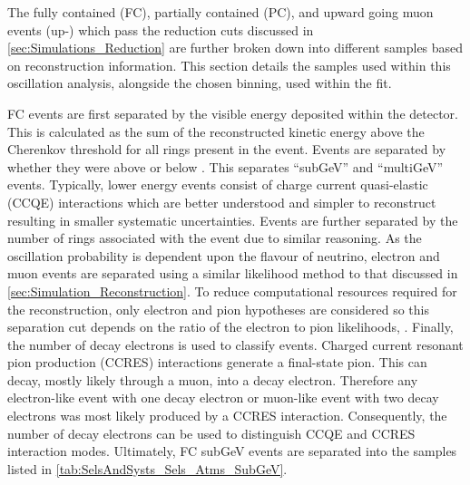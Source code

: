 The fully contained (FC), partially contained (PC), and upward going muon events (up-\quickmath{\mu}) which pass the reduction cuts discussed in \autoref{sec:Simulations_Reduction} are further broken down into different samples based on reconstruction information. This section details the samples used within this oscillation analysis, alongside the chosen binning, used within the fit.

FC events are first separated by the visible energy deposited within the detector. This is calculated as the sum of the reconstructed kinetic energy above the Cherenkov threshold for all rings present in the event. Events are separated by whether they were above or below . This separates ``subGeV'' and ``multiGeV'' events. Typically, lower energy events consist of charge current quasi-elastic (CCQE) interactions which are better understood and simpler to reconstruct resulting in smaller systematic uncertainties. Events are further separated by the number of rings associated with the event due to similar reasoning. As the oscillation probability is dependent upon the flavour of neutrino, electron and muon events are separated using a similar likelihood method to that discussed in \autoref{sec:Simulation_Reconstruction}. To reduce computational resources required for the reconstruction, only electron and pion hypotheses are considered so this separation cut depends on the ratio of the electron to pion likelihoods, . Finally, the number of decay electrons is used to classify events. Charged current resonant pion production (CCRES) interactions generate a final-state pion. This can decay, mostly likely through a muon, into a decay electron. Therefore any electron-like event with one decay electron or muon-like event with two decay electrons was most likely produced by a CCRES interaction. Consequently, the number of decay electrons can be used to distinguish CCQE and CCRES interaction modes. Ultimately, FC subGeV events are separated into the samples listed in \autoref{tab:SelsAndSysts_Sels_Atms_SubGeV}.

